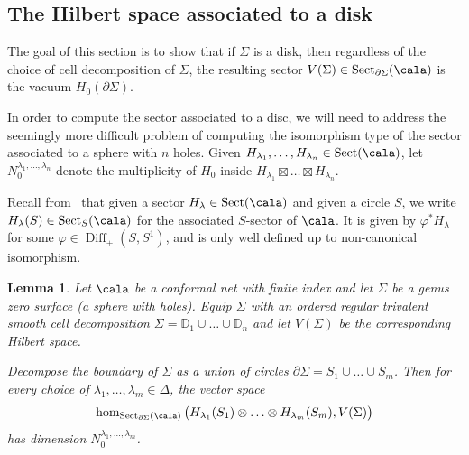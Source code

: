 \documentclass[a4paper,10pt,leqno]{amsart}
\newcommand{\subsecsectorsfornets}{Sec.~1B}
\newcommand{\ID}{\mathbb{D}}     \newcommand{\cald}{\mathcal{D}}
\theoremstyle{plain}
\newtheorem{lemma}[theorem]{Lemma}
\theoremstyle{definition}
\theoremstyle{remark}
\DeclareMathOperator{\Diff}{Diff}
\DeclareMathOperator{\Rep}{Sect}
\begin{document}
\subsection{The Hilbert space associated to a disk}
The goal of this section is to show that if $\Sigma$ is a disk, then
regardless of the choice of cell decomposition of $\Sigma$, the resulting sector $V(\Sigma)\in\Rep_{\partial\Sigma}(\cala)$ is the vacuum $H_0(\partial \Sigma)$.

In order to compute the sector associated to a disc, we will need to address the seemingly more difficult problem of computing the isomorphism 
type of the sector associated to a sphere with $n$ holes.
Given $H_{\lambda_1},\ldots, H_{\lambda_n}\in\Rep(\cala)$,
let $N_0^{\lambda_1,\ldots,\lambda_n}$ denote the multiplicity of $H_0$ inside $H_{\lambda_1}\boxtimes\ldots\boxtimes H_{\lambda_n}$.

Recall from~\cite[\subsecsectorsfornets]{BDH(nets)} 
that given a sector $H_{\lambda}\in\Rep(\cala)$ and given a circle $S$, 
we write $H_\lambda(S)\in \Rep_S(\cala)$ for the associated $S$-sector of $\cala$.
It is given by $\varphi^* H_\lambda$ for some $\varphi\in\Diff_+(S, S^1)$, and is only well defined up to non-canonical isomorphism.



\begin{lemma}\label{lem: computation of V((000))}
Let $\cala$ be a conformal net with finite index and let $\Sigma$ be a genus zero surface (a sphere with holes).
Equip $\Sigma$ with an ordered regular trivalent smooth cell decomposition $\Sigma=\ID_1\cup\ldots\cup \ID_n$ and let $V(\Sigma)$ be the corresponding Hilbert space.

Decompose the boundary of $\Sigma$ as a union of circles $\partial \Sigma=S_1\cup\ldots\cup S_m$.
Then for every choice of $\lambda_1,\ldots, \lambda_m \in \Delta$, the vector space
\[
\hom_{\Rep_{\partial\Sigma}(\cala)}\big(H_{\lambda_1}(S_1)\otimes\ldots\otimes H_{\lambda_m}(S_m),V(\Sigma)\big)
\]
has dimension $N_0^{\lambda_1,\ldots,\lambda_m}$.
\end{lemma}
\end{document}
